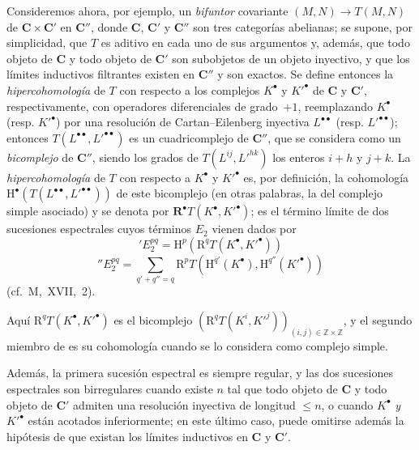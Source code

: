 \begin{env}[11.4.6]
\label{0.11.4.6}
\label{0.11.4.6-fr}
Consideremos ahora, por ejemplo, un \emph{bifuntor} covariante $(M,N)\to T(M,N)$ de $\boldsymbol{C}\times\boldsymbol{C}'$ en $\boldsymbol{C}''$, donde $\boldsymbol{C}$, $\boldsymbol{C}'$ y $\boldsymbol{C}''$ son tres categorías abelianas;
se supone, por simplicidad, que $T$ es aditivo en cada uno de sus argumentos y, además, que todo objeto de $\boldsymbol{C}$ y todo objeto de $\boldsymbol{C}'$ son subobjetos de un objeto inyectivo,
y que los límites inductivos filtrantes existen en $\boldsymbol{C}''$ y son exactos.
Se define entonces la \emph{hipercohomología} de $T$ con respecto a los complejos $K^\bullet$ y $K'^\bullet$ de $\boldsymbol{C}$ y $\boldsymbol{C}'$, respectivamente, con operadores diferenciales de grado~$+1$, reemplazando $K^\bullet$ (resp. $K'^\bullet$) por una resolución de Cartan--Eilenberg inyectiva $L^{\bullet\bullet}$ (resp. $L'^{\bullet\bullet}$);
entonces $T(L^{\bullet\bullet},L'^{\bullet\bullet})$ es un cuadricomplejo de $\boldsymbol{C}''$, que se considera como un \emph{bicomplejo} de $\boldsymbol{C}''$, siendo los grados de $T(L^{ij},L'^{hk})$ los enteros $i+h$ y $j+k$.
La \emph{hipercohomología} de $T$ con respecto a $K^\bullet$ y $K'^\bullet$ es, por definición, la cohomología $\mathrm H^\bullet(T(L^{\bullet\bullet},L'^{\bullet\bullet}))$ de este bicomplejo (en otras palabras, la del complejo simple asociado) y se denota por $\mathbf R^\bullet T(K^\bullet,K'^\bullet)$;
es el término límite de dos sucesiones espectrales cuyos términos $E_2$ vienen dados por
\[
  \label{0.11.4.6.1-fr}
  'E_2^{pq}=\mathrm H^p(\mathrm R^qT(K^\bullet,K'^\bullet))
  \tag{11.4.6.1}
\]
\[
  \label{0.11.4.6.2-fr}
  ''E_2^{pq}=\sum_{q'+q''=q}
  \mathrm R^pT(\mathrm H^{q'}(K^\bullet),\mathrm H^{q''}(K'^\bullet))
  \tag{11.4.6.2}
\]
(cf.~M,~XVII,~2).

Aquí $\mathrm R^qT(K^\bullet,K'^\bullet)$ es el bicomplejo $(\mathrm R^qT(K^i,K'^j))_{(i,j)\in\mathbb Z\times\mathbb Z}$, y el segundo miembro de  es su cohomología cuando se lo considera como complejo simple.

Además, la primera sucesión espectral es siempre regular, y las dos sucesiones espectrales son birregulares cuando existe $n$ tal que todo objeto de $\boldsymbol{C}$ y todo objeto de $\boldsymbol{C}'$ admiten una resolución inyectiva de longitud $\leq n$, o cuando $K^\bullet$ \emph{y} $K'^\bullet$ están acotados inferiormente;
en este último caso, puede omitirse además la hipótesis de que existan los límites inductivos en $\boldsymbol{C}$ y $\boldsymbol{C}'$.


\end{env}
